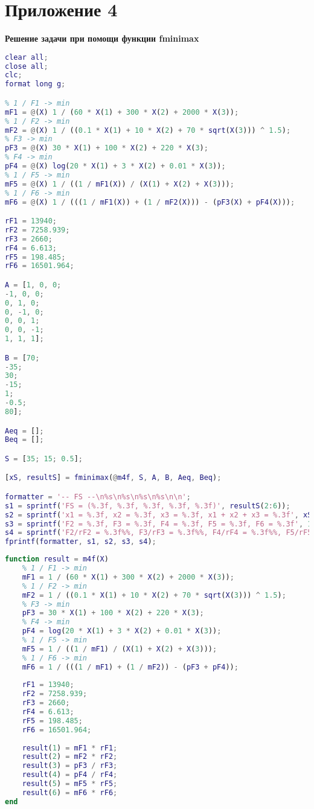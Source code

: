\section*{Приложение 4} \label{p1:4}
\textbf{Решение задачи при помощи функции fminimax}
\begin{lstlisting}[language={matlab}, caption={Решение задачи при помощи функции fminimax}, label={lst:0}, basicstyle={\footnotesize\ttfamily}, breaklines={true}]
clear all;
close all; 
clc;
format long g;

% 1 / F1 -> min
mF1 = @(X) 1 / (60 * X(1) + 300 * X(2) + 2000 * X(3));
% 1 / F2 -> min
mF2 = @(X) 1 / ((0.1 * X(1) + 10 * X(2) + 70 * sqrt(X(3))) ^ 1.5);
% F3 -> min
pF3 = @(X) 30 * X(1) + 100 * X(2) + 220 * X(3);
% F4 -> min
pF4 = @(X) log(20 * X(1) + 3 * X(2) + 0.01 * X(3));
% 1 / F5 -> min
mF5 = @(X) 1 / ((1 / mF1(X)) / (X(1) + X(2) + X(3)));
% 1 / F6 -> min
mF6 = @(X) 1 / (((1 / mF1(X)) + (1 / mF2(X))) - (pF3(X) + pF4(X)));

rF1 = 13940;
rF2 = 7258.939;
rF3 = 2660;
rF4 = 6.613;
rF5 = 198.485;
rF6 = 16501.964;

A = [1, 0, 0;
-1, 0, 0;
0, 1, 0;
0, -1, 0;
0, 0, 1;
0, 0, -1;
1, 1, 1];

B = [70;
-35;
30;
-15;
1;
-0.5;
80];

Aeq = [];
Beq = [];

S = [35; 15; 0.5];

[xS, resultS] = fminimax(@m4f, S, A, B, Aeq, Beq);

formatter = '-- FS --\n%s\n%s\n%s\n%s\n\n';
s1 = sprintf('FS = (%.3f, %.3f, %.3f, %.3f, %.3f)', resultS(2:6));
s2 = sprintf('x1 = %.3f, x2 = %.3f, x3 = %.3f, x1 + x2 + x3 = %.3f', xS, sum(xS));
s3 = sprintf('F2 = %.3f, F3 = %.3f, F4 = %.3f, F5 = %.3f, F6 = %.3f', 1 / mF2(xS), pF3(xS), pF4(xS), 1 / mF5(xS), 1 / mF6(xS));
s4 = sprintf('F2/rF2 = %.3f%%, F3/rF3 = %.3f%%, F4/rF4 = %.3f%%, F5/rF5 = %.3f%%, F6/rF6 = %.3f%%', (1 / mF2(xS)) / rF2 * 100, pF3(xS) / rF3 * 100, pF4(xS) / rF4 * 100, (1 / mF5(xS)) / rF5 * 100, (1 / mF6(xS)) / rF6 * 100);
fprintf(formatter, s1, s2, s3, s4);
\end{lstlisting}

\begin{lstlisting}[language={matlab}, caption={Внутренняя функция для fminimax}, label={lst:0}, basicstyle={\footnotesize\ttfamily}, breaklines={true}]
function result = m4f(X)
	% 1 / F1 -> min
	mF1 = 1 / (60 * X(1) + 300 * X(2) + 2000 * X(3));
	% 1 / F2 -> min
	mF2 = 1 / ((0.1 * X(1) + 10 * X(2) + 70 * sqrt(X(3))) ^ 1.5);
	% F3 -> min
	pF3 = 30 * X(1) + 100 * X(2) + 220 * X(3);
	% F4 -> min
	pF4 = log(20 * X(1) + 3 * X(2) + 0.01 * X(3));
	% 1 / F5 -> min
	mF5 = 1 / ((1 / mF1) / (X(1) + X(2) + X(3)));
	% 1 / F6 -> min
	mF6 = 1 / (((1 / mF1) + (1 / mF2)) - (pF3 + pF4));
	
	rF1 = 13940;
	rF2 = 7258.939;
	rF3 = 2660;
	rF4 = 6.613;
	rF5 = 198.485;
	rF6 = 16501.964;
	
	result(1) = mF1 * rF1;
	result(2) = mF2 * rF2;
	result(3) = pF3 / rF3;
	result(4) = pF4 / rF4;
	result(5) = mF5 * rF5;
	result(6) = mF6 * rF6;
end
\end{lstlisting}

